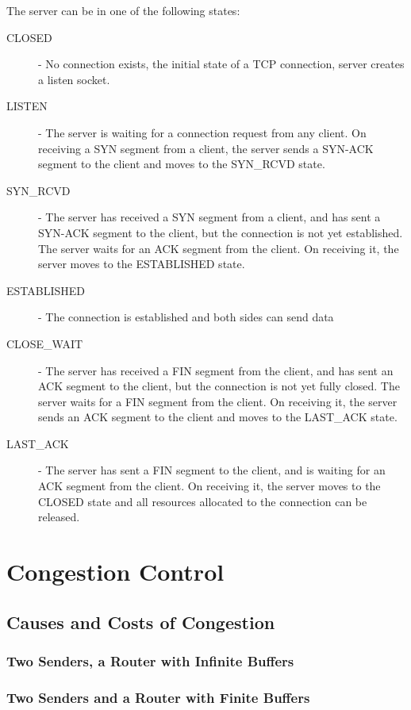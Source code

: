 \documentclass[12pt letter]{report}
\begin{document}
The server can be in one of the following states:
\begin{description}
  \item[CLOSED]  - No connection exists, the initial state of a TCP
    connection, server creates a listen socket.
  \item[LISTEN] - The server is waiting for a connection request from
    any client. On receiving a SYN segment from a client, the server
    sends a SYN-ACK segment to the client and moves to the SYN\_RCVD state.
  \item[SYN\_RCVD] - The server has received a SYN segment from a client, and
    has sent a SYN-ACK segment to the client, but the connection is not yet
    established. The server waits for an ACK segment from the client. On
    receiving it, the server moves to the ESTABLISHED state.
  \item[ESTABLISHED] - The connection is established and both sides
    can send data
  \item[CLOSE\_WAIT] - The server has received a FIN segment from the
    client, and has sent an ACK segment to the client, but the
    connection is not yet fully closed. The server waits for a FIN
    segment from the client. On receiving it, the server sends an ACK
    segment to the client and moves to the LAST\_ACK state.
  \item[LAST\_ACK] - The server has sent a FIN segment to the
    client, and is waiting for an ACK segment from the client. On
    receiving it, the server moves to the CLOSED state and all resources
    allocated to the connection can be released.
\end{description}

\section{Congestion Control}

\subsection{Causes and Costs of Congestion}

\subsubsection{Two Senders, a Router with Infinite Buffers}

\subsubsection{Two Senders and a Router with Finite Buffers}
\end{document}
